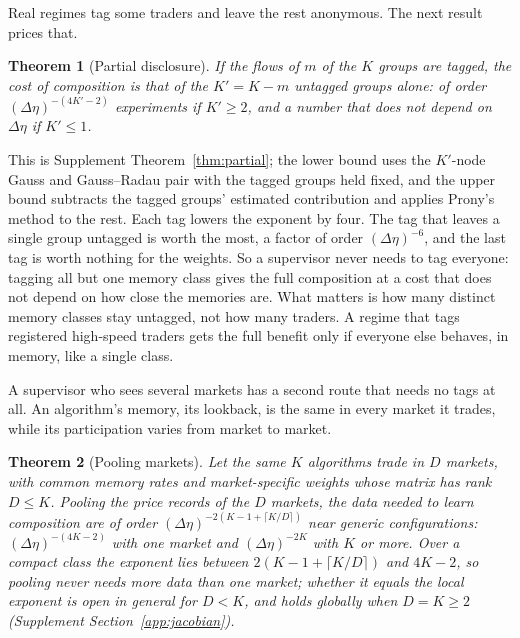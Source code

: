 \documentclass[12pt]{article}
\newtheorem{theorem}{Theorem}[section]
\theoremstyle{definition}
\theoremstyle{remark}
\begin{document}
Real regimes tag some traders and leave the rest anonymous. The next result prices that.

\begin{theorem}[Partial disclosure]\label{n:partial}
If the flows of $m$ of the $K$ groups are tagged, the cost of composition is that of the $K'=K-m$ untagged groups alone: of order $(\Delta\eta)^{-(4K'-2)}$ experiments if $K'\ge2$, and a number that does not depend on $\Delta\eta$ if $K'\le1$.
\end{theorem}

This is Supplement Theorem~\ref{thm:partial}; the lower bound uses the $K'$-node Gauss and Gauss--Radau pair with the tagged groups held fixed, and the upper bound subtracts the tagged groups' estimated contribution and applies Prony's method to the rest. Each tag lowers the exponent by four. The tag that leaves a single group untagged is worth the most, a factor of order $(\Delta\eta)^{-6}$, and the last tag is worth nothing for the weights. So a supervisor never needs to tag everyone: tagging all but one memory class gives the full composition at a cost that does not depend on how close the memories are. What matters is how many distinct memory classes stay untagged, not how many traders. A regime that tags registered high-speed traders gets the full benefit only if everyone else behaves, in memory, like a single class.

A supervisor who sees several markets has a second route that needs no tags at all. An algorithm's memory, its lookback, is the same in every market it trades, while its participation varies from market to market.

\begin{theorem}[Pooling markets]\label{n:pool}
Let the same $K$ algorithms trade in $D$ markets, with common memory rates and market-specific weights whose matrix has rank $D\le K$. Pooling the price records of the $D$ markets, the data needed to learn composition are of order $(\Delta\eta)^{-2(K-1+\lceil K/D\rceil)}$ near generic configurations: $(\Delta\eta)^{-(4K-2)}$ with one market and $(\Delta\eta)^{-2K}$ with $K$ or more. Over a compact class the exponent lies between $2(K-1+\lceil K/D\rceil)$ and $4K-2$, so pooling never needs more data than one market; whether it equals the local exponent is open in general for $D < K$, and holds globally when $D = K \ge 2$ (Supplement Section~\ref{app:jacobian}).
\end{theorem}
\end{document}
